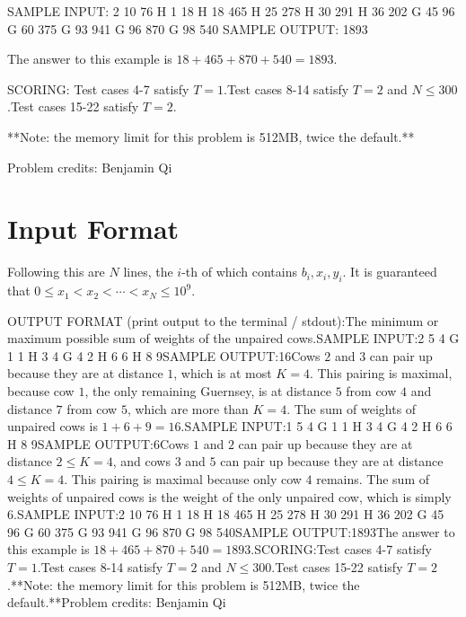 \documentclass[12pt]{article}
\begin{document}
SAMPLE INPUT:
2 10 76
H 1 18
H 18 465
H 25 278
H 30 291
H 36 202
G 45 96
G 60 375
G 93 941
G 96 870
G 98 540
SAMPLE OUTPUT: 
1893

The answer to this example is $18+465+870+540=1893$.

SCORING:
Test cases 4-7 satisfy $T=1$.Test cases 8-14 satisfy $T=2$ and $N\le 300$.Test cases 15-22 satisfy $T=2$.

**Note: the memory limit for this problem is 512MB, twice the default.**

Problem credits: Benjamin Qi



\section*{Input Format}
Following this are $N$ lines, the $i$-th of which contains $b_i,x_i,y_i$. It is
guaranteed that $0\le x_1< x_2< \cdots< x_N\le 10^9$.

OUTPUT FORMAT (print output to the terminal / stdout):The minimum or maximum possible sum of weights of the unpaired cows.SAMPLE INPUT:2 5 4
G 1 1
H 3 4
G 4 2
H 6 6
H 8 9SAMPLE OUTPUT:16Cows $2$ and $3$ can pair up because they are at distance $1$, which is at most
$K = 4$. This pairing is maximal, because cow $1$, the only remaining Guernsey,
is at distance $5$ from cow $4$ and distance $7$ from cow $5$, which are more
than $K = 4$. The sum of weights of unpaired cows is
$1 + 6 + 9 = 16$.SAMPLE INPUT:1 5 4
G 1 1
H 3 4
G 4 2
H 6 6
H 8 9SAMPLE OUTPUT:6Cows $1$ and $2$ can pair up because they are at distance $2 \leq K = 4$, and
cows $3$ and $5$ can pair up because they are at distance $4 \leq K = 4$. This
pairing is maximal because only cow $4$ remains. The sum of weights of
unpaired cows is the weight of the only unpaired cow, which is simply $6$.SAMPLE INPUT:2 10 76
H 1 18
H 18 465
H 25 278
H 30 291
H 36 202
G 45 96
G 60 375
G 93 941
G 96 870
G 98 540SAMPLE OUTPUT:1893The answer to this example is $18+465+870+540=1893$.SCORING:Test cases 4-7 satisfy $T=1$.Test cases 8-14 satisfy $T=2$ and $N\le 300$.Test cases 15-22 satisfy $T=2$.**Note: the memory limit for this problem is 512MB, twice the default.**Problem credits: Benjamin Qi
\end{document}
